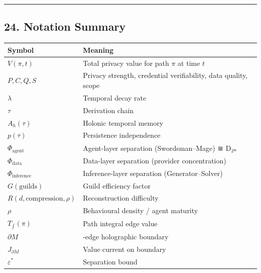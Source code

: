 \documentclass[
]{article}
\newcounter{none} %
\begin{document}
\begin{center}\rule{0.5\linewidth}{0.5pt}\end{center}

\subsection{24. Notation Summary}\label{notation-summary}

{\def\LTcaptype{none} %
\begin{longtable}[]{@{}
  >{\raggedright\arraybackslash}p{}
  >{\raggedright\arraybackslash}p{}@{}}
\toprule\noalign{}
\begin{minipage}[b]{\linewidth}\raggedright
Symbol
\end{minipage} & \begin{minipage}[b]{\linewidth}\raggedright
Meaning
\end{minipage} \\
\midrule\noalign{}
\endhead
\bottomrule\noalign{}
\endlastfoot
\(V(\pi, t)\) & Total privacy value for path \(\pi\) at time \(t\) \\
\(P, C, Q, S\) & Privacy strength, credential verifiability, data
quality, scope \\
\(\lambda\) & Temporal decay rate \\
\(\tau\) & Derivation chain \\
\(A_h(\tau)\) & Holonic temporal memory \\
\(p(\tau)\) & Persistence independence \\
\(\Phi_{\text{agent}}\) & Agent-layer separation (Swordsman--Mage) ≅
D₂ₙ \\
\(\Phi_{\text{data}}\) & Data-layer separation (provider
concentration) \\
\(\Phi_{\text{inference}}\) & Inference-layer separation
(Generator--Solver) \\
\(G(\text{guilds})\) & Guild efficiency factor \\
\(R(d, \text{compression}, \rho)\) & Reconstruction difficulty \\
\(\rho\) & Behavioural density / agent maturity \\
\(T_\int(\pi)\) & Path integral edge value \\
\(\partial M\) & 96-edge holographic boundary \\
\(J_{\partial M}\) & Value current on boundary \\
\(\varepsilon^*\) & Separation bound \\

\end{longtable}}
\end{document}
